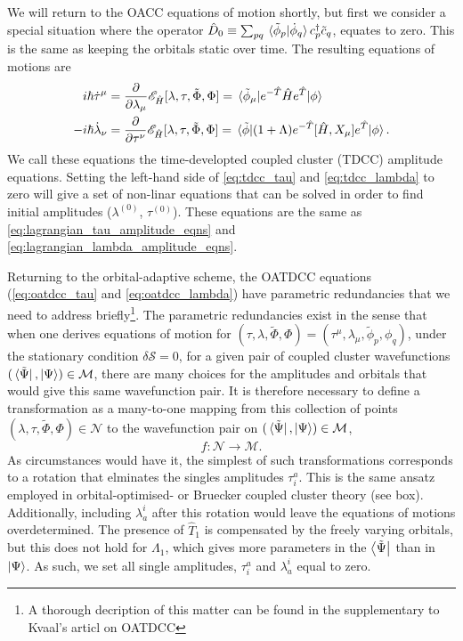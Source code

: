 We will return to the OACC equations of motion shortly, but first we consider a special 
situation where the operator
$\hat{D}_0 \equiv \sum_{pq} \braket*{\tilde{\phi}_p}{\dot{\phi}_q}c^\dagger_p\tilde{c}_q$,
equates to zero. This is the same as keeping the orbitals static over time. The 
resulting equations of motions are 
\begin{align}
    \label{eq:tdcc_tau}
    i\hbar\dot{\tau}^\mu 
        &= \frac{\partial}{\partial \lambda_\mu}\mathscr{E}_{\hat{H}}
            [\lambda, \tau, \tilde{\Phi}, \Phi]
        = \mel*{\tilde{\phi}_\mu}
            {e^{-\hat{T}}\hat{H}e^{\hat{T}}}
        {\phi} \\
    \label{eq:tdcc_lambda}
    -i\hbar\dot{\lambda}_\nu
        &= \frac{\partial}{\partial \tau^\nu}\mathscr{E}_{\hat{H}}
            [\lambda, \tau, \tilde{\Phi}, \Phi]
        = \mel*{\tilde{\phi}}
            {(1 + \Lambda)e^{-\hat{T}}[\hat{H}, X_\mu]e^{\hat{T}}}
        {\phi}.
\end{align}
We call these equations the time-developted coupled cluster (TDCC) amplitude equations. 
Setting the left-hand side of
\autoref{eq:tdcc_tau} and \autoref{eq:tdcc_lambda} to zero will give a set of 
non-linar equations that can be solved in order to find initial amplitudes 
($\lambda^{(0)}$, $\tau^{(0)}$). These equations are the same as 
\autoref{eq:lagrangian_tau_amplitude_eqns} and \autoref{eq:lagrangian_lambda_amplitude_eqns}.

Returning to the orbital-adaptive scheme, the OATDCC equations 
(\autoref{eq:oatdcc_tau} and \autoref{eq:oatdcc_lambda}) have parametric redundancies
that we need to address briefly\footnote{A thorough decription of this matter can be 
found in the supplementary to Kvaal's articl on OATDCC\cite{kvaal2012ab}}. The 
parametric redundancies exist in the sense that when one derives equations of motion
for 
$(\tau, \lambda, \tilde{\Phi}, \Phi) = (\tau^\mu, \lambda_\mu, \tilde{\phi}_p, \phi_q)$,
under the stationary condition
$\delta\mathcal{S} = 0$, for a given pair of coupled cluster wavefunctions
$(\bra*{\tilde{\Psi}}, \ket{\Psi}) \in \mathcal{M}$, there are many choices for the amplitudes and 
orbitals that would give this same wavefunction pair. It is therefore necessary 
to define a transformation as a many-to-one mapping from this collection of points
$(\lambda, \tau, \tilde{\Phi}, \Phi) \in \mathcal{N}$
to the wavefunction pair on $(\bra*{\tilde{\Psi}}, \ket{\Psi}) \in \mathcal{M}$,
\begin{equation}
   f : \mathcal{N} \to \mathcal{M}. 
\end{equation}
As circumstances would have it, the simplest of such transformations corresponds to 
a rotation that elminates the singles amplitudes $\tau^a_i$. This is the same ansatz 
employed in orbital-optimised-  or Bruecker coupled cluster theory (see box). Additionally,
including $\lambda^i_a$ after this rotation would leave the equations of motions 
overdetermined. The presence of $\hat{T}_1$ is compensated by the freely 
varying orbitals, but this does not hold for $\Lambda_1$, which gives more 
parameters in the $\bra{\tilde{\Psi}}$ than in $\ket{\Psi}$. As such, we set all 
single amplitudes, $\tau^a_i$ and $\lambda^i_a$ equal to zero.

